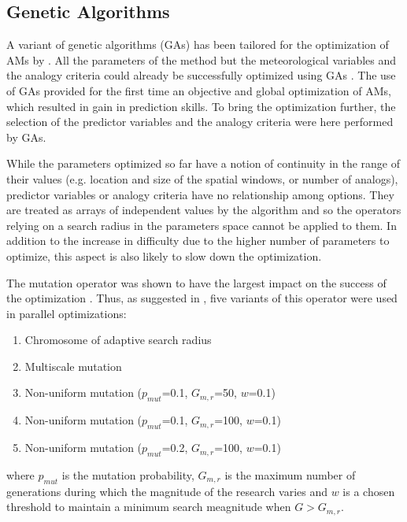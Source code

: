 \documentclass[draft]{agujournal2019}
\begin{document}
\subsection{Genetic Algorithms}
\label{gas}

A variant of genetic algorithms (GAs) has been tailored for the optimization of AMs by . All the parameters of the method but the meteorological variables and the analogy criteria could already be successfully optimized using GAs \cite{Horton2018a}. The use of GAs provided for the first time an objective and global optimization of AMs, which resulted in gain in prediction skills. To bring the optimization further, the selection of the predictor variables and the analogy criteria were here performed by GAs. 

While the parameters optimized so far have a notion of continuity in the range of their values (e.g. location and size of the spatial windows, or number of analogs), predictor variables or analogy criteria have no relationship among options. They are treated as arrays of independent values by the algorithm and so the operators relying on a search radius in the parameters space \cite{Horton2017a} cannot be applied to them. In addition to the increase in difficulty due to the higher number of parameters to optimize, this aspect is also likely to slow down the optimization.

The mutation operator was shown to have the largest impact on the success of the optimization \cite{Horton2017a}. Thus, as suggested in , five variants of this operator were used in parallel optimizations: 

\begin{enumerate}
	\item Chromosome of adaptive search radius
	\item Multiscale mutation
	\item Non-uniform mutation ($p_{mut}$=0.1, $G_{m,r}$=50, $w$=0.1)
	\item Non-uniform mutation ($p_{mut}$=0.1, $G_{m,r}$=100, $w$=0.1)
	\item Non-uniform mutation ($p_{mut}$=0.2, $G_{m,r}$=100, $w$=0.1)
\end{enumerate}

where $p_{mut}$ is the mutation probability, $G_{m,r}$ is the maximum number of generations
during which the magnitude of the research varies and $w$ is a chosen threshold to maintain a minimum search meagnitude when $G>G_{m,r}$.
\end{document}
